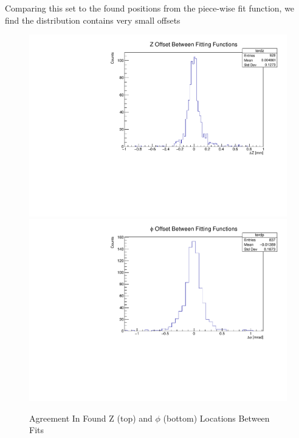 Comparing this set to the found positions from the piece-wise fit function, we find the distribution contains very small offsets

\begin{figure}[h]

    \centering
    \includegraphics[width=.7\linewidth]{graphics/terdzhc.pdf}
    \includegraphics[width=.7\linewidth]{graphics/terdphc.pdf}
    \caption{Agreement In Found Z (top) and $\phi$ (bottom) Locations Between Fits}
    \label{fig:fitcompare}
\end{figure}


